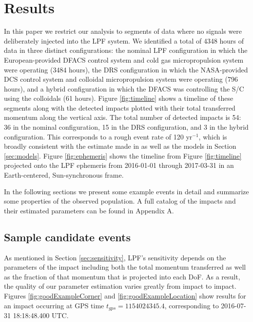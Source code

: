\documentclass[twocolumn, trackchanges]{aastex62}
\newcommand{\nhours}{4348 }
\begin{document}
\section{Results} \label{sec:results}
In this paper we restrict our analysis to segments of data where no signals were deliberately injected into the LPF system. We identified a total of \nhours hours of data in three distinct configurations: the nominal LPF configuration in which the European-provided DFACS control system and cold gas micropropulsion system were operating (3484 hours), the DRS configuration in which the NASA-provided DCS control system and colloidal micropropulsion system were operating (796 hours), and a hybrid configuration in which the DFACS was controlling the S/C using the colloidals (61 hours). Figure \ref{fig:timeline} shows a timeline of these segments along with the detected impacts plotted with their total transferred momentum along the vertical axis. The total number of detected impacts is 54: 36 in the nominal configuration, 15 in the DRS configuration, and 3 in the hybrid configuration. This corresponds to a rough event rate of 120 yr$^{-1}$, which is broadly consistent with the estimate made in \cite{Thorpe:2015cxa} as well as the models in Section \ref{sec:models}.  Figure \ref{fig:ephemeris} shows the timeline from Figure \ref{fig:timeline} projected onto the LPF ephemeris from 2016-01-01 through 2017-03-31 in an Earth-centered, Sun-synchronous frame.
 
In the following sections we present some example events in detail and summarize some properties of the observed population.  A full catalog of the impacts and their estimated parameters can be found in Appendix A.

\subsection{Sample candidate events \label{sec:samples}}
As mentioned in Section \ref{sec:sensitivity}, LPF's sensitivity depends on the parameters of the impact including both the total momentum transferred as well as the fraction of that momentum that is  projected into each DoF.  As a result, the quality of our parameter estimation varies greatly from impact to impact.  Figures \ref{fig:goodExampleCorner} and \ref{fig:goodExampleLocation} show results for an impact occurring at GPS time $t_{gps}=1154024345.4$, corresponding to 2016-07-31 18:18:48.400 UTC. 
\end{document}

